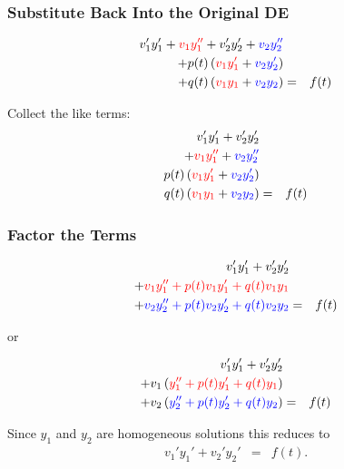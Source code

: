 \begin{frame}
  \frametitle{Substitute Back Into the Original DE}

  \begin{eqnarray*}
    v_1' y_1' + {\color{red}v_1 y_1''} + v_2' y_2' + {\color{blue}v_2 y_2''} & & \\
    + p(t) \left( {\color{red}v_1 y_1'} + {\color{blue}v_2 y_2'} \right) & & \\
    + q(t) \left( {\color{red}v_1 y_1} + {\color{blue}v_2 y_2} \right) & = & f(t)
  \end{eqnarray*}

  Collect the like terms:
  \begin{eqnarray*}
    v_1' y_1' + v_2' y_2'  & & \\
    + {\color{red}v_1 y_1''} + {\color{blue}v_2 y_2''} & & \\
    p(t) \left( {\color{red}v_1 y_1'} + {\color{blue}v_2 y_2'} \right) & & \\
    q(t) \left( {\color{red}v_1 y_1}  + {\color{blue}v_2 y_2} \right) & = & f(t)
  \end{eqnarray*}


\end{frame}


\begin{frame}
  \frametitle{Factor the Terms}

  \begin{eqnarray*}
    v_1' y_1' + v_2' y_2'  & & \\
    + {\color{red} v_1 y_1'' + p(t) v_1 y_1' + q(t) v_1 y_1} & & \\
    + {\color{blue}v_2 y_2'' + p(t) v_2 y_2' + q(t) v_2 y_2} & = & f(t)
  \end{eqnarray*}

  or 

  \begin{eqnarray*}
    v_1' y_1' + v_2' y_2'  & & \\
    + v_1 \left(  {\color{red}y_1'' + p(t) y_1' + q(t) y_1} \right) & & \\
    + v_2 \left( {\color{blue}y_2'' + p(t) y_2' + q(t) y_2} \right) & = & f(t)
  \end{eqnarray*}

  Since $y_1$ and $y_2$ are homogeneous solutions this reduces to 
  \begin{eqnarray}
    \label{eqn:secondConstraint}
    v_1' y_1' + v_2' y_2'  & = & f(t).
  \end{eqnarray}


\end{frame}


